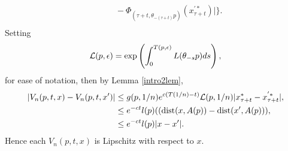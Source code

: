 \begin{prf}
\begin{align*}
    &\hspace{1cm} - \Phi_{(\tau+t, \theta_{-(\tau+t)} p)}
      (x^{'*}_{\tau+t}) |  \}. \\
  \end{align*}
  Setting
  \[ \mathcal{L}(p, \epsilon) = \exp \left( \int_0^{T(p, \epsilon)} L(\theta_{-s} p) ds
    \right), \]
  for ease of notation, then by Lemma \ref{intro2lem},
  \begin{align*}
  |V_n(p, t, x) - V_n( p, t, x')| &\leq g(p, 1/n) e^{c(T(1/n)-t)}
    \mathcal{L}(p, 1/n) |x^*_{\tau + t} - x^{'*}_{\tau + t}|, \\
    &\leq e^{-ct} l(p) (({\rm dist}(x, A(p)) - {\rm dist}(x', A(p))), \\
    &\leq e^{-ct} l(p) |x - x'|. \\
  \end{align*}
  Hence each $V_n(p, t, x)$ is Lipschitz with respect to $x$.


\end{prf}
